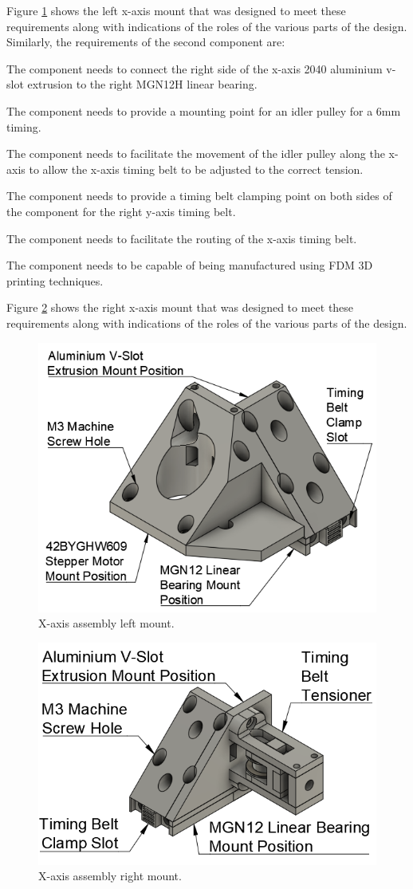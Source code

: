 Figure \ref{fig:x-axis-mount-left} shows the left x-axis mount that was designed to meet these requirements along with indications of the roles of the various parts of the design. Similarly, the requirements of the second component are:

\begin{compactitem}
	\item The component needs to connect the right side of the x-axis 2040 aluminium v-slot extrusion to the right MGN12H linear bearing.
	\item The component needs to provide a mounting point for an idler pulley for a 6mm timing.
	\item The component needs to facilitate the movement of the idler pulley along the x-axis to allow the x-axis timing belt to be adjusted to the correct tension.
	\item The component needs to provide a timing belt clamping point on both sides of the component for the right y-axis timing belt.
	\item The component needs to facilitate the routing of the x-axis timing belt.
	\item The component needs to be capable of being manufactured using FDM 3D printing techniques.
\end{compactitem}

Figure \ref{fig:x-axis-mount-right} shows the right x-axis mount that was designed to meet these requirements along with indications of the roles of the various parts of the design.

\begin{figure}[H]
	\centering
	\includegraphics[width=0.45\linewidth]{figures/x-axis-mount-left.png}
	\caption{X-axis assembly left mount.}
	\label{fig:x-axis-mount-left}
\end{figure}

\begin{figure}[H]
	\centering
	\includegraphics[width=0.4\linewidth]{figures/x-axis-mount-right.png}
	\caption{X-axis assembly right mount.}
	\label{fig:x-axis-mount-right}
\end{figure}

